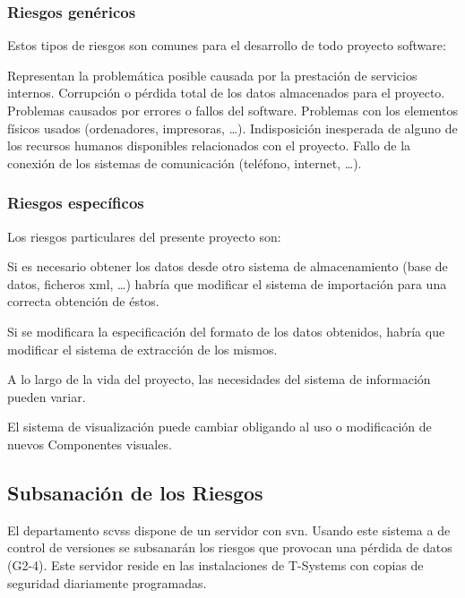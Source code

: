 \subsubsection{Riesgos genéricos}
Estos tipos de riesgos son comunes para el desarrollo de todo proyecto software:
\begin{enumerate}[label=\bfseries G\arabic*]
    Representan la problemática posible causada por la prestación de servicios internos. 
    Corrupción o pérdida total de los datos almacenados para el proyecto.
	Problemas causados por errores o fallos del \gls{software}.
    Problemas con los elementos físicos usados (ordenadores, impresoras, \dots).
    Indisposición inesperada de alguno de los recursos humanos disponibles relacionados con el proyecto.
    Fallo de la conexión de los sistemas de comunicación (teléfono, internet, \dots).
\end{enumerate}

\subsubsection{Riesgos específicos}
Los riesgos particulares del presente proyecto son:

\begin{enumerate}[label=\bfseries E\arabic*]
	Si es necesario obtener los datos desde otro sistema de almacenamiento (base de datos, ficheros \gls{xml}, \dots) habría que modificar el sistema de importación para una correcta obtención de éstos.
    
    Si se modificara la especificación del formato de los datos obtenidos, habría que modificar el sistema de extracción de los mismos.
    
    A lo largo de la vida del proyecto, las necesidades del sistema de información pueden variar.
    
    El sistema de visualización puede cambiar obligando al uso o modificación de nuevos Componentes  visuales.
\end{enumerate}

\subsection{Subsanación de los Riesgos}    
El departamento \gls{scvss} dispone de un servidor con \gls{svn}. Usando este sistema a de control de versiones se subsanarán los riesgos que provocan una pérdida de datos (G2-4). Este servidor reside en las instalaciones de T-Systems con copias de seguridad diariamente programadas.\\


